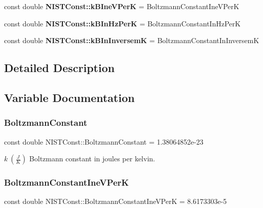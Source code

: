 \begin{DoxyCompactItemize}
const double {\bfseries N\+I\+S\+T\+Const\+::k\+B\+Ine\+V\+PerK} = Boltzmann\+Constant\+Ine\+V\+PerK
\item 
\mbox{\label{group___boltzmann_constant_gaa7a3aa5798c9617d09120f8041c93433}} 
const double {\bfseries N\+I\+S\+T\+Const\+::k\+B\+In\+Hz\+PerK} = Boltzmann\+Constant\+In\+Hz\+PerK
\item 
\mbox{\label{group___boltzmann_constant_ga54bf445c848dc6dc425076bf6ab45d83}} 
const double {\bfseries N\+I\+S\+T\+Const\+::k\+B\+In\+InversemK} = Boltzmann\+Constant\+In\+InversemK
\end{DoxyCompactItemize}


\subsection{Detailed Description}


\subsection{Variable Documentation}
\mbox{\label{group___boltzmann_constant_ga505057a2eb7e925fde668cc1025331df}} 
\subsubsection{\texorpdfstring{Boltzmann\+Constant}{BoltzmannConstant}}
{\footnotesize\ttfamily const double N\+I\+S\+T\+Const\+::\+Boltzmann\+Constant = 1.\+38064852e-\/23}

$k \ (\frac{J}{K})$ Boltzmann constant in joules per kelvin. \mbox{\label{group___boltzmann_constant_gad31ba56bbe6d4a0f40252ef7b48b52a3}} 
\subsubsection{\texorpdfstring{Boltzmann\+Constant\+Ine\+V\+PerK}{BoltzmannConstantIneVPerK}}
{\footnotesize\ttfamily const double N\+I\+S\+T\+Const\+::\+Boltzmann\+Constant\+Ine\+V\+PerK = 8.\+6173303e-\/5}

